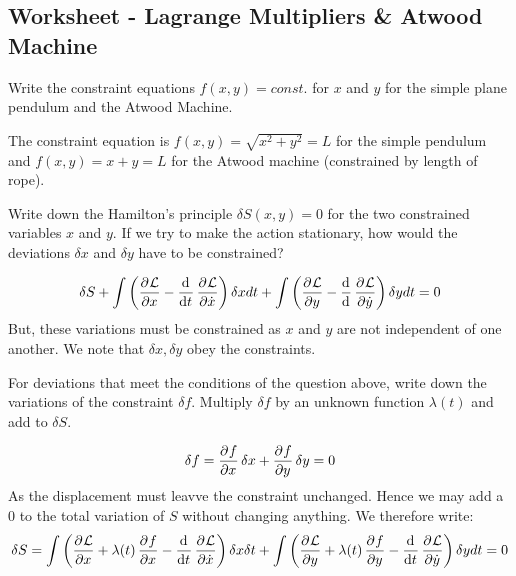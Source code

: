 \documentclass[../PHYS306Notes.tex]{subfiles}
\begin{document}
\subsection{Worksheet - Lagrange Multipliers \& Atwood Machine}
\begin{p}
Write the constraint equations $f(x,y) = const.$ for $x$ and $y$ for the simple plane pendulum and the Atwood Machine.
\end{p}
\begin{s}
The constraint equation is $f(x, y) = \sqrt{x^2 + y^2} = L$ for the simple pendulum and $f(x, y) = x + y = L$ for the Atwood machine (constrained by length of rope).
\end{s}

\begin{p}
Write down the Hamilton's principle $\delta S(x,y) = 0$ for the two constrained variables $x$ and $y$. If we try to make the action stationary, how would the deviations $\delta x$ and $\delta y$ have to be constrained?
\end{p}
\begin{s}
\begin{align*}
    \delta S + \int\left(\dpd{\LL}{x} - \dod{}{t}\dpd{\LL}{\dot{x}}\right)\delta x dt + \int \left(\dpd{\LL}{y} - \dod{}{}\dpd{\LL}{\dot{y}}\right)\delta y dt = 0
\end{align*}
But, these variations must be constrained as $x$ and $y$ are not independent of one another. We note that $\delta x, \delta y$ obey the constraints.
\end{s}

\begin{p}
For deviations that meet the conditions of the question above, write down the variations of the constraint $\delta f$. Multiply $\delta f$ by an unknown function $\lambda(t)$ and add to $\delta S$.
\end{p}
\begin{s}
\[\delta f = \dpd{f}{x}\delta x + \dpd{f}{y}\delta y = 0\]
As the displacement must leavve the constraint unchanged. Hence we may add a $0$ to the total variation of $S$ without changing anything. We therefore write:
\[\delta S = \int \left(\dpd{\LL}{x} + \lambda(t)\dpd{f}{x} - \dod{}{t}\dpd{\LL}{\dot{x}}\right)\delta x \delta t + \int\left(\dpd{\LL}{y} + \lambda(t)\dpd{f}{y} - \dod{}{t}\dpd{\LL}{\dot{y}}\right)\delta y dt = 0\]
\end{s}
\end{document}
